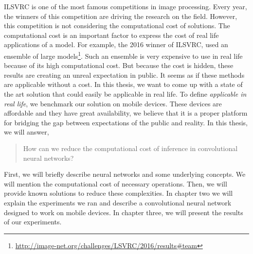 ILSVRC is one of the most famous competitions in image processing. Every year, the winners of this competition are driving the research on the field. However, this competition is not considering the computational cost of solutions. The computational cost is an important factor to express the cost of real life applications of a model. For example, the 2016 winner of ILSVRC, used an ensemble of large models\footnote{\url{http://image-net.org/challenges/LSVRC/2016/results\#team}}. Such an ensemble is very expensive to use in real life because of its high computational cost. But because the cost is hidden, these results are creating an unreal expectation in public. It seems as if these methods are applicable without a cost. In this thesis, we want to come up with a state of the art solution that could easily be applicable in real life. To define \textit{applicable in real life}, we benchmark our solution on mobile devices. These devices are affordable and they have great availability, we believe that it is a proper platform for bridging the gap between expectations of the public and reality. In this thesis, we will answer,

\begin{quote}
How can we reduce the computational cost of inference in convolutional neural networks?
\end{quote}

First, we will briefly describe neural networks and some underlying concepts. We will mention the computational cost of necessary operations. Then, we will provide known solutions to reduce these complexities. In chapter two we will explain the experiments we ran and describe a convolutional neural network designed to work on mobile devices. In chapter three, we will present the results of our experiments. 


